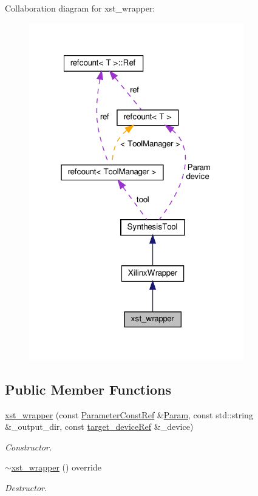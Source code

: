 Collaboration diagram for xst\+\_\+wrapper\+:
\nopagebreak
\begin{figure}[H]
\begin{center}
\leavevmode
\includegraphics[width=265pt]{d6/dcb/classxst__wrapper__coll__graph}
\end{center}
\end{figure}
\subsection*{Public Member Functions}
\begin{DoxyCompactItemize}
\item 
\hyperlink{classxst__wrapper_abfb651706b55e67022547c9ecafd39a5}{xst\+\_\+wrapper} (const \hyperlink{Parameter_8hpp_a37841774a6fcb479b597fdf8955eb4ea}{Parameter\+Const\+Ref} \&\hyperlink{classSynthesisTool_a854ef102782ff4d069e1aa6d1a94d64e}{Param}, const std\+::string \&\+\_\+output\+\_\+dir, const \hyperlink{target__device_8hpp_acedb2b7a617e27e6354a8049fee44eda}{target\+\_\+device\+Ref} \&\+\_\+device)
\begin{DoxyCompactList}\small\item\em Constructor. \end{DoxyCompactList}\item 
\hyperlink{classxst__wrapper_a27480802ccb070027ca10f43f3777a2b}{$\sim$xst\+\_\+wrapper} () override
\begin{DoxyCompactList}\small\item\em Destructor. \end{DoxyCompactList}\end{DoxyCompactItemize}
